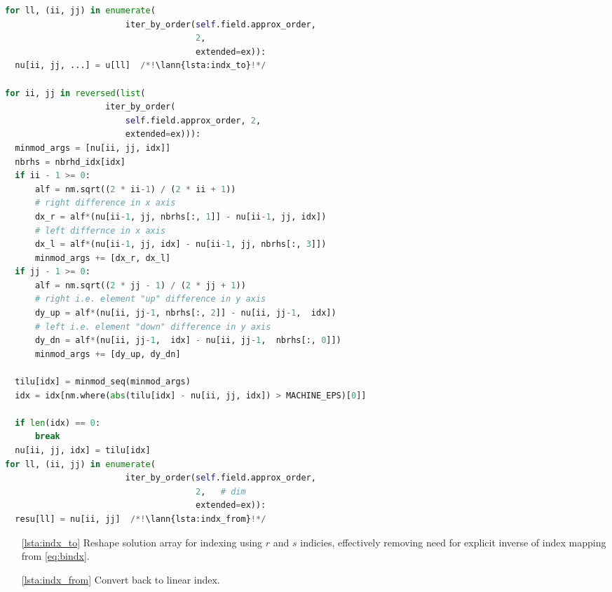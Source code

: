 \setcounter{lstannotation}{0}
\begin{lstlisting}[language=Python, caption=Moment limiter for 
cartesian grid \label{lst:limiter_2D}]
for ll, (ii, jj) in enumerate(
                        iter_by_order(self.field.approx_order, 
                                      2,
                                      extended=ex)):
  nu[ii, jj, ...] = u[ll]  /*!\lann{lsta:indx_to}!*/

for ii, jj in reversed(list(
                    iter_by_order(
                        self.field.approx_order, 2,
                        extended=ex))):
  minmod_args = [nu[ii, jj, idx]]
  nbrhs = nbrhd_idx[idx]
  if ii - 1 >= 0:
      alf = nm.sqrt((2 * ii-1) / (2 * ii + 1))
      # right difference in x axis
      dx_r = alf*(nu[ii-1, jj, nbrhs[:, 1]] - nu[ii-1, jj, idx])
      # left differnce in x axis
      dx_l = alf*(nu[ii-1, jj, idx] - nu[ii-1, jj, nbrhs[:, 3]])
      minmod_args += [dx_r, dx_l]
  if jj - 1 >= 0:
      alf = nm.sqrt((2 * jj - 1) / (2 * jj + 1))
      # right i.e. element "up" difference in y axis
      dy_up = alf*(nu[ii, jj-1, nbrhs[:, 2]] - nu[ii, jj-1,  idx])
      # left i.e. element "down" difference in y axis
      dy_dn = alf*(nu[ii, jj-1,  idx] - nu[ii, jj-1,  nbrhs[:, 0]])
      minmod_args += [dy_up, dy_dn]
      
  tilu[idx] = minmod_seq(minmod_args)
  idx = idx[nm.where(abs(tilu[idx] - nu[ii, jj, idx]) > MACHINE_EPS)[0]]
  
  if len(idx) == 0:
      break
  nu[ii, jj, idx] = tilu[idx]
for ll, (ii, jj) in enumerate(
                        iter_by_order(self.field.approx_order, 
                                      2,   # dim
                                      extended=ex)):
  resu[ll] = nu[ii, jj]  /*!\lann{lsta:indx_from}!*/

\end{lstlisting}
\begin{itemize}
    \item[\ref{lsta:indx_to}] Reshape solution array for indexing using $r$ and $s$ indicies, effectively removing need for explicit inverse of index mapping from \eqref{eq:bindx}.
    
    \item [\ref{lsta:indx_from}] Convert back to linear index.
\end{itemize}


